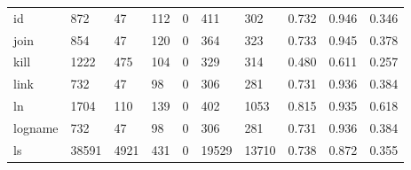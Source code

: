 \begin{longtable}{lp{1.3cm}p{1.3cm}p{1.3cm}p{1.3cm}p{1.3cm}p{1.3cm}p{1.3cm}p{1.3cm}p{1.3cm}}
id        &                    872 &                                 47 &                               112 &                                0 &                               411 &                             302 &                                0.732 &                                  0.946 &                                0.346 \\
join      &                    854 &                                 47 &                               120 &                                0 &                               364 &                             323 &                                0.733 &                                  0.945 &                                0.378 \\
kill      &                   1222 &                                475 &                               104 &                                0 &                               329 &                             314 &                                0.480 &                                  0.611 &                                0.257 \\
link      &                    732 &                                 47 &                                98 &                                0 &                               306 &                             281 &                                0.731 &                                  0.936 &                                0.384 \\
ln        &                   1704 &                                110 &                               139 &                                0 &                               402 &                            1053 &                                0.815 &                                  0.935 &                                0.618 \\
logname   &                    732 &                                 47 &                                98 &                                0 &                               306 &                             281 &                                0.731 &                                  0.936 &                                0.384 \\
ls        &                  38591 &                               4921 &                               431 &                                0 &                             19529 &                           13710 &                                0.738 &                                  0.872 &                                0.355 \\

\end{longtable}

